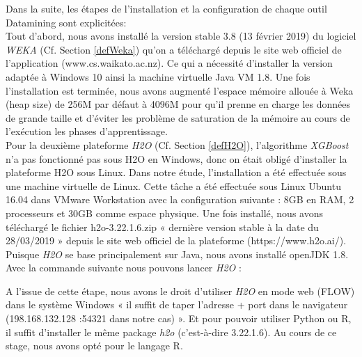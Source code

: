 Dans la suite, les étapes de l'installation et la configuration de chaque outil Datamining sont explicitées:\\


Tout d'abord, nous avons installé la version stable 3.8 (13 février 2019) du logiciel \textit{WEKA} (Cf. Section \ref{defWeka}) qu'on a téléchargé depuis le site web officiel de l'application (www.cs.waikato.ac.nz). Ce qui a nécessité d'installer la version adaptée à Windows 10 ainsi la machine virtuelle Java VM 1.8. Une fois l'installation est terminée, nous avons augmenté l'espace mémoire allouée à Weka (heap size) de 256M par défaut à 4096M ‬pour qu'il prenne en charge les données de grande taille et d'éviter les problème de saturation de la mémoire au cours de l'exécution les phases d'apprentissage.\\

Pour la deuxième plateforme \textit{H2O} (Cf. Section \ref{defH2O}), l'algorithme \textit{XGBoost} n'a pas fonctionné pas sous H2O en Windows, donc on était obligé d’installer la plateforme H2O sous Linux.  Dans notre étude, l'installation a été effectuée sous une machine virtuelle de Linux. Cette tâche a été effectuée sous Linux Ubuntu 16.04 dans VMware Workstation avec la configuration suivante : 8GB en RAM, 2 processeurs et 30GB comme espace physique.
Une fois installé, nous avons téléchargé le fichier h2o-3.22.1.6.zip « dernière version stable à la date du 28/03/2019 » depuis le site web officiel de la plateforme (https://www.h2o.ai/).\\

Puisque \textit{H2O} se base principalement sur Java, nous avons installé openJDK 1.8. Avec la commande suivante nous pouvons lancer \textit{H2O} :
\begin{figure}[!htb]
\end{figure}

A l'issue de cette étape, nous avons le droit d’utiliser \textit{H2O} en mode web (FLOW) dans le système Windows « il suffit de taper l’adresse + port dans le navigateur (198.168.132.128 :54321 dans notre cas) ». Et pour pouvoir utiliser Python ou R, il suffit d’installer le même package \textit{h2o} (c’est-à-dire 3.22.1.6). Au cours de ce stage, nous avons opté pour le langage R. \\

